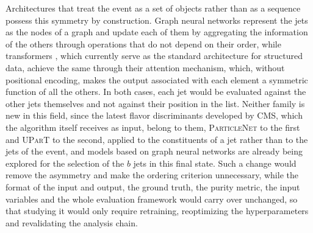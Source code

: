 Architectures that treat the event as a set of objects rather than as a sequence possess this symmetry by construction. Graph neural networks \cite{Shlomi:2020gdn} represent the jets as the nodes of a graph and update each of them by aggregating the information of the others through operations that do not depend on their order, while transformers \cite{Vaswani2017}, which currently serve as the standard architecture for structured data, achieve the same through their attention mechanism, which, without positional encoding, makes the output associated with each element a symmetric function of all the others. In both cases, each jet would be evaluated against the other jets themselves and not against their position in the list. Neither family is new in this field, since the latest flavor discriminants developed by CMS, which the algorithm itself receives as input, belong to them, \textsc{ParticleNet} \cite{PNet} to the first and \textsc{UParT} \cite{Qu:2022mxj,CMS-UParT} to the second, applied to the constituents of a jet rather than to the jets of the event, and models based on graph neural networks are already being explored for the selection of the $b$ jets in this final state. Such a change would remove the asymmetry and make the ordering criterion unnecessary, while the format of the input and output, the ground truth, the purity metric, the input variables and the whole evaluation framework would carry over unchanged, so that studying it would only require retraining, reoptimizing the hyperparameters and revalidating the analysis chain.\medskip




